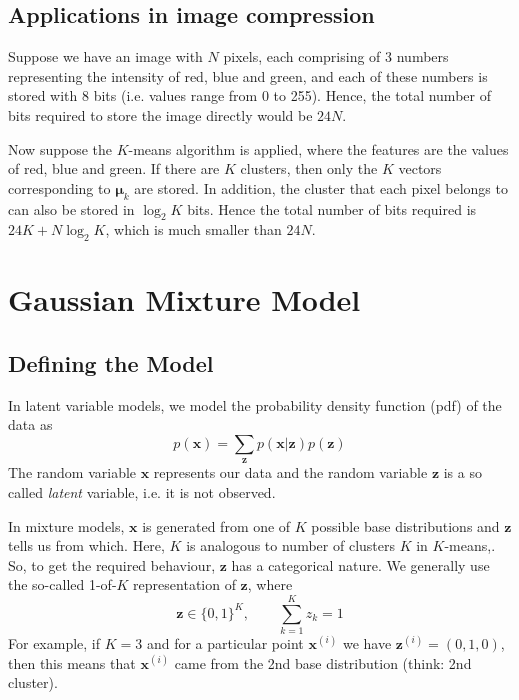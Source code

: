\documentclass[final,3p,times]{elsarticle}
\begin{document}
\subsection*{Applications in image compression}
\label{sect:Kmeans-img}

Suppose we have an image with $N$ pixels, each comprising of 3 numbers representing the intensity of red, blue and green, and each of these numbers is stored with 8 bits (i.e. values range from 0 to 255). Hence, the total number of bits required to store the image directly would be $24N$.

Now suppose the $K$-means algorithm is applied, where the features are the values of red, blue and green. If there are $K$ clusters, then only the $K$ vectors corresponding to $\boldsymbol{\mu}_k$ are stored. In addition, the cluster that each pixel belongs to can also be stored in $\log_2 K$ bits. Hence the total number of bits required is $24K + N \log_2 K$, which is much smaller than $24N$.

\section{Gaussian Mixture Model}
\label{sect:GMM}

\subsection*{Defining the Model}
\label{sect:GMM-def}

In latent variable models, we model the probability density function (pdf) of the data as 
\begin{equation}
p(\boldsymbol{x}) = \sum_{\boldsymbol{z}} p(\boldsymbol{x}|\boldsymbol{z})p(\boldsymbol{z})
\label{eqn:mixtures}
\end{equation}
The random variable $\boldsymbol{x}$ represents our data and the random variable $\boldsymbol{z}$ is a so called \emph{latent} variable, i.e. it is not observed.

In mixture models, $\boldsymbol{x}$ is generated from one of $K$ possible base distributions and $\boldsymbol{z}$ tells us from which. Here, $K$ is analogous to number of clusters $K$ in $K$-means,. So, to get the required behaviour, $\boldsymbol{z}$ has a categorical nature. We generally use the so-called 1-of-$K$ representation of $\boldsymbol{z}$, where 
\begin{equation}
\boldsymbol{z} \in \{0,1\}^K, \qquad \sum_{k=1}^K z_k = 1
\label{eqn:1-of-K}
\end{equation}
For example, if $K=3$ and for a particular point $\boldsymbol{x}^{(i)}$ we have $\boldsymbol{z}^{(i)} = (0,1,0)$, then this means that $\boldsymbol{x}^{(i)}$ came from the 2nd base distribution (think: 2nd cluster).
\end{document}
